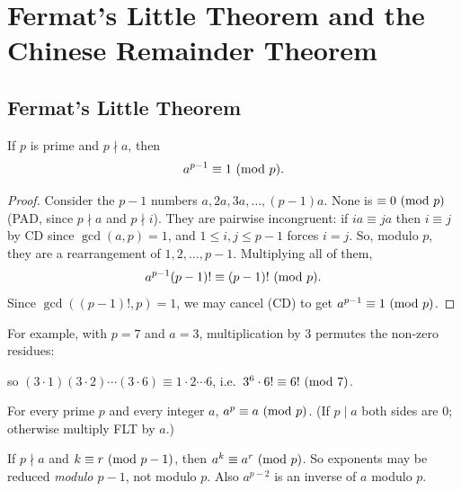 \chapter[Fermat's Little Theorem and CRT]{Fermat's Little Theorem and the Chinese Remainder Theorem}

\section{Fermat's Little Theorem}

\begin{theorem}
If $p$ is prime and $p \nmid a$, then
\[ a^{p-1} \equiv 1 \ (\mathrm{mod}\ p). \]
\end{theorem}

\begin{proof}
Consider the $p - 1$ numbers $a, 2a, 3a, \dots, (p-1)a$. None is $\equiv 0 \ (\mathrm{mod}\ p)$ (PAD, since
$p \nmid a$ and $p \nmid i$). They are pairwise incongruent: if $ia \equiv ja$ then $i \equiv j$
by CD since $\gcd(a,p) = 1$, and $1 \le i,j \le p-1$ forces $i = j$. So, modulo $p$, they are
a rearrangement of $1, 2, \dots, p-1$. Multiplying all of them,
\[ a^{p-1}(p-1)! \equiv (p-1)! \ (\mathrm{mod}\ p). \]
Since $\gcd((p-1)!, p) = 1$, we may cancel (CD) to get $a^{p-1} \equiv 1 \ (\mathrm{mod}\ p)$.
\end{proof}

For example, with $p = 7$ and $a = 3$, multiplication by $3$ permutes the non-zero residues:
\begin{center}
\end{center}
so $(3\cdot 1)(3\cdot 2)\cdots(3\cdot 6) \equiv 1\cdot 2\cdots 6$, i.e.\ $3^6\cdot 6! \equiv 6!
\ (\mathrm{mod}\ 7)$.

\begin{corollary}
For every prime $p$ and every integer $a$, $a^p \equiv a \ (\mathrm{mod}\ p)$. (If $p \mid a$ both sides are
$0$; otherwise multiply FLT by $a$.)
\end{corollary}

\begin{important}
If $p \nmid a$ and $k \equiv r \ (\mathrm{mod}\ p-1)$, then $a^k \equiv a^r \ (\mathrm{mod}\ p)$. So exponents may be
reduced \emph{modulo $p-1$}, not modulo $p$. Also $a^{p-2}$ is an inverse of $a$ modulo $p$.
\end{important}

